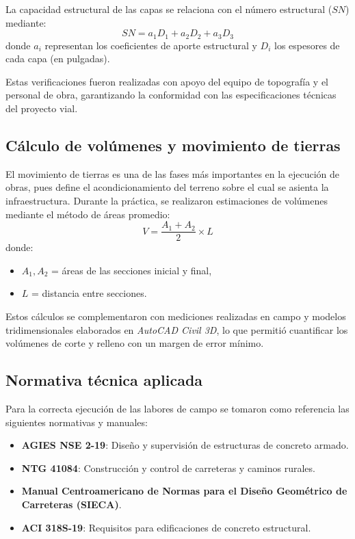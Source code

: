 \documentclass[12pt]{article}
\begin{document}
	La capacidad estructural de las capas se relaciona con el número estructural ($SN$) mediante:
	\[
	SN = a_1D_1 + a_2D_2 + a_3D_3
	\]
	donde $a_i$ representan los coeficientes de aporte estructural y $D_i$ los espesores de cada capa (en pulgadas).
	
	Estas verificaciones fueron realizadas con apoyo del equipo de topografía y el personal de obra, garantizando la conformidad con las especificaciones técnicas del proyecto vial.
	
	\subsection{Cálculo de volúmenes y movimiento de tierras}
	
	El movimiento de tierras es una de las fases más importantes en la ejecución de obras, pues define el acondicionamiento del terreno sobre el cual se asienta la infraestructura.  
	Durante la práctica, se realizaron estimaciones de volúmenes mediante el método de áreas promedio:
	\[
	V = \frac{A_1 + A_2}{2} \times L
	\]
	donde:
	\begin{itemize}
		\item $A_1, A_2$ = áreas de las secciones inicial y final,
		\item $L$ = distancia entre secciones.
	\end{itemize}
	
	Estos cálculos se complementaron con mediciones realizadas en campo y modelos tridimensionales elaborados en \textit{AutoCAD Civil 3D}, lo que permitió cuantificar los volúmenes de corte y relleno con un margen de error mínimo.
	
	\subsection{Normativa técnica aplicada}
	
	Para la correcta ejecución de las labores de campo se tomaron como referencia las siguientes normativas y manuales:
	\begin{itemize}
		\item \textbf{AGIES NSE 2-19}: Diseño y supervisión de estructuras de concreto armado.
		\item \textbf{NTG 41084}: Construcción y control de carreteras y caminos rurales.
		\item \textbf{Manual Centroamericano de Normas para el Diseño Geométrico de Carreteras (SIECA)}.
		\item \textbf{ACI 318S-19}: Requisitos para edificaciones de concreto estructural.
	\end{itemize}
	
\end{document}
